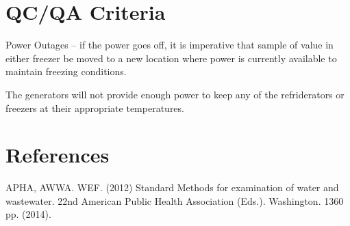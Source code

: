 \documentclass[12pt]{../SOP3_alpha}\usepackage[]{graphicx}\usepackage[]{xcolor}
\begin{document}

\section{QC/QA Criteria}

\NP Power Outages -- if the power goes off, it is imperative that sample of value in either freezer be moved to a new location where power is currently available to maintain freezing conditions. 

\NP The generators will not provide enough power to keep any of the refriderators or freezers at their appropriate temperatures.

\section{References}

\NP APHA, AWWA. WEF. (2012) Standard Methods for examination of water and wastewater. 22nd American Public Health Association (Eds.). Washington. 1360 pp. (2014).
\end{document}
